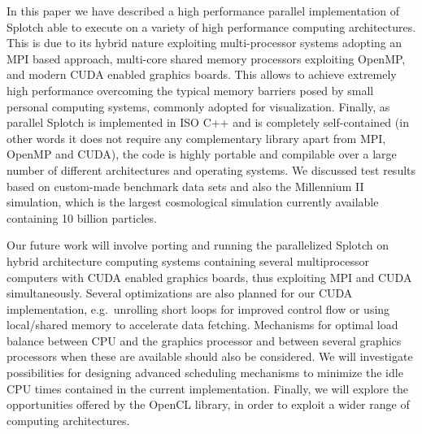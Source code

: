 \documentclass[1p,times]{elsarticle}
\begin{document}

In this paper we have described a high performance parallel implementation of Splotch 
able to execute on a variety of high performance computing architectures. This is due 
to its hybrid nature exploiting multi-processor systems adopting an MPI based approach,
multi-core shared memory processors exploiting OpenMP, and modern CUDA enabled graphics 
boards. This allows to achieve extremely high performance overcoming the typical memory 
barriers posed by small personal computing systems, commonly adopted for visualization. 
Finally, as parallel Splotch is implemented in ISO C++ and is completely self-contained
(in other words it does not require any complementary library apart from MPI, OpenMP and CUDA), 
the code is highly portable and compilable over a large number of different 
architectures and operating systems. We discussed test results based on 
custom-made benchmark data sets and also the Millennium II simulation, which is the
largest cosmological simulation currently available containing 10 billion particles.

Our future work will involve porting and running the parallelized Splotch on hybrid 
architecture computing systems containing several multiprocessor computers with CUDA 
enabled graphics boards, thus exploiting MPI and CUDA simultaneously. 
Several optimizations are also planned for our CUDA implementation, e.g.\ unrolling 
short loops for improved control flow or using local/shared memory to accelerate data fetching. 
Mechanisms for optimal load balance between CPU and the graphics processor and between several 
graphics processors when these are available should also be considered. We will 
investigate possibilities for designing advanced scheduling mechanisms to minimize 
the idle CPU times contained in the current implementation. Finally, we will explore the 
opportunities offered by the OpenCL library, in order to exploit a wider range of 
computing architectures. 
\end{document}
